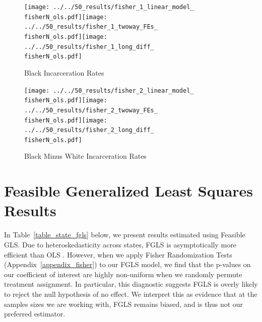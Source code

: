 \documentclass[12pt]{article}
\begin{document}
\begin{figure}[h!]
	\centering
	\caption{Black Incarceration Rates}\label{figure_fisher1}
	\texttt{[image: ../../50\_results/fisher\_1\_linear\_model\_\\fisherN\_ols.pdf]}\texttt{[image: ../../50\_results/fisher\_1\_twoway\_FEs\_\\fisherN\_ols.pdf]}\texttt{[image: ../../50\_results/fisher\_1\_long\_diff\_\\fisherN\_ols.pdf]}
\end{figure}


\begin{figure}[h!]
	\centering
	\caption{Black Minus White Incarceration Rates}\label{figure_fisher2}
	\texttt{[image: ../../50\_results/fisher\_2\_linear\_model\_\\fisherN\_ols.pdf]}\texttt{[image: ../../50\_results/fisher\_2\_twoway\_FEs\_\\fisherN\_ols.pdf]}\texttt{[image: ../../50\_results/fisher\_2\_long\_diff\_\\fisherN\_ols.pdf]}
\end{figure}


\section{Feasible Generalized Least Squares Results}\label{appendix_fgls}
\setcounter{table}{0}
\setcounter{figure}{0}
\renewcommand{\thetable}{K\arabic{table}}
\renewcommand{\thefigure}{K\arabic{figure}}
\normalsize

In Table~\ref{table_state_fgls} below, we present results estimated using Feasible GLS. Due to heteroskedasticity across states, FGLS is asymptotically more efficient than OLS . However, when we apply Fisher Randomization Tests (Appendix~\ref{appendix_fisher}) to our FGLS model, we find that the p-values on our coefficient of interest are highly non-uniform when we randomly permute treatment assignment. In particular, this diagnostic suggests FGLS is overly likely to reject the null hypothesis of no effect. We interpret this as evidence that at the samples sizes we are working with, FGLS remains biased, and is thus not our preferred estimator.
\end{document}
